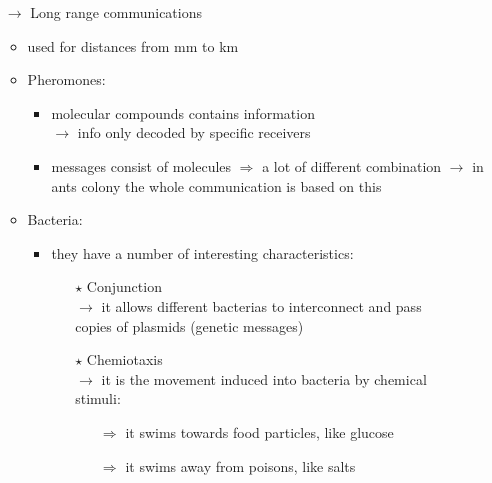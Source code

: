 \begin{itemize}
\begin{itemize}
\begin{itemize}
\begin{itemize}
            \end{itemize} 
        \end{itemize}
        \item[$\rightarrow$] Long range communications
        \begin{itemize}
            \item used for distances from mm to km
            \item Pheromones:
            \begin{itemize}
                \item molecular compounds contains information\\
                $\rightarrow$ info only decoded by specific receivers
                \item messages consist of molecules $\Rightarrow$ a lot of different combination
                $\rightarrow$ in ants colony the whole communication is based on this
            \end{itemize}
            \item Bacteria:
            \begin{itemize}
                \item they have a number of interesting characteristics:
                \begin{enumerate}
                    \addtolength{\itemindent}{0.3cm}
                    \item[$\star$] Conjunction\\[0.15cm]
                    \hspace*{0.3cm}$\rightarrow$ it allows different bacterias to interconnect and pass\\
                    \hspace*{0.3cm}copies of plasmids (genetic messages)
                    \item[$\star$] Chemiotaxis\\[0.15cm]
                    \hspace*{0.3cm}$\rightarrow$ it is the movement induced into bacteria by chemical\\
                    \hspace*{0.3cm}stimuli:
                    \vspace*{-0.1cm}
                    \begin{enumerate}
                        \addtolength{\itemindent}{0.7cm}
                        \item[$\Rightarrow$] it swims towards food particles, like glucose
                        \item[$\Rightarrow$] it  swims away from poisons, like salts

\end{enumerate}
\end{enumerate}
\end{itemize}
\end{itemize}
\end{itemize}
\end{itemize}
